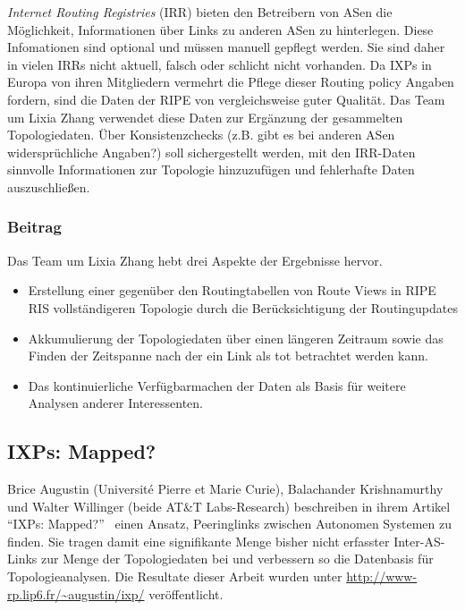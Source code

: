 \emph{Internet Routing Registries} (IRR) bieten den Betreibern von ASen die Möglichkeit, Informationen über Links zu anderen ASen zu hinterlegen.
Diese Infomationen sind optional und müssen manuell gepflegt werden.
Sie sind daher in vielen IRRs nicht aktuell, falsch oder schlicht nicht vorhanden.
Da IXPs in Europa von ihren Mitgliedern vermehrt die Pflege dieser Routing policy Angaben fordern, sind die Daten der RIPE von vergleichsweise guter Qualität.
Das Team um Lixia Zhang verwendet diese Daten zur Ergänzung der gesammelten Topologiedaten.
Über Konsistenzchecks (z.B. gibt es bei anderen ASen widersprüchliche Angaben?) soll sichergestellt werden, mit den IRR-Daten sinnvolle Informationen zur Topologie hinzuzufügen und fehlerhafte Daten auszuschließen.

\subsubsection{Beitrag}
Das Team um Lixia Zhang hebt drei Aspekte der Ergebnisse hervor.
\begin{itemize}
  \item Erstellung einer gegenüber den Routingtabellen von Route Views in RIPE RIS vollständigeren Topologie durch die Berücksichtigung der Routingupdates
  \item Akkumulierung der Topologiedaten über einen längeren Zeitraum sowie das Finden der Zeitspanne nach der ein Link als tot betrachtet werden kann.
  \item Das kontinuierliche Verfügbarmachen der Daten als Basis für weitere Analysen anderer Interessenten.
\end{itemize}

\subsection{IXPs: Mapped?}

Brice Augustin (Université Pierre et Marie Curie), Balachander Krishnamurthy  und Walter Willinger (beide AT\&T Labs-Research) beschreiben in ihrem Artikel "`IXPs: Mapped?"'~\cite{Augustin:2009:IM:1644893.1644934} einen Ansatz, Peeringlinks zwischen Autonomen Systemen zu finden.
Sie tragen damit eine signifikante Menge bisher nicht erfasster Inter-AS-Links zur Menge der Topologiedaten bei und verbessern so die Datenbasis für Topologieanalysen.
Die Resultate dieser Arbeit wurden unter \url{http://www-rp.lip6.fr/~augustin/ixp/} veröffentlicht.


